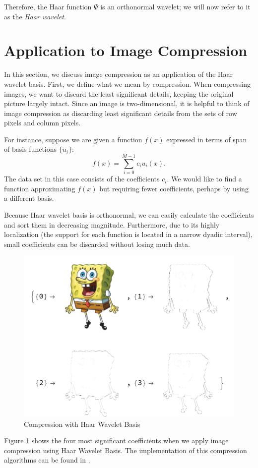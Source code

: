 \documentclass[11pt]{amsart}
\theoremstyle{theorem} %
\theoremstyle{definition}
\theoremstyle{example}
\theoremstyle{remark}
\numberwithin{equation}{section}
\begin{document}
Therefore, the Haar function $ \varPsi $ is an orthonormal wavelet; we will now refer to it as the \emph{Haar wavelet}.

\section{Application to Image Compression} \label{section:application}
In this section, we discuss image compression as an application of the Haar wavelet basis. First, we define what we mean by compression. When compressing images, we want to discard the least significant details, keeping the original picture largely intact. Since an image is two-dimensional, it is helpful to think of image compression as discarding least significant details from the sets of row pixels and column pixels. 

For instance, suppose we are given a function $ f(x) $ expressed in terms of span of basis functions $ \{ u_i \} $:
	\[ f(x) = \sum_{i=0}^{M-1} c_i u_i(x). \]
The data set in this case consists of the coefficients $ c_i $. We would like to find a function approximating $ f(x) $ but requiring fewer coefficients, perhaps by using a different basis.

Because Haar wavelet basis is orthonormal, we can easily calculate the coefficients and sort them in decreasing magnitude. Furthermore, due to its highly localization (the support for each function is located in a narrow dyadic interval), small coefficients can be discarded without losing much data.

\begin{figure}[h]
	\centering
	\includegraphics[width=0.7\linewidth]{img/s.png}
	\caption{Compression with Haar Wavelet Basis}
	\label{fig:s2}
\end{figure}

Figure \ref{fig:s2} shows the four most significant coefficients when we apply image compression using Haar Wavelet Basis. The implementation of this compression algorithms can be found in \cite{stollnitz}.


\newpage
\printbibliography
\end{document}
